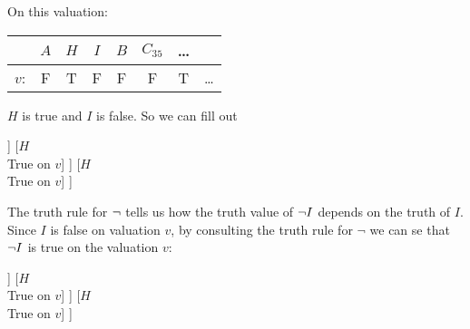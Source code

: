 On this valuation:
\begin{center}
	\begin{tabular}{rccccccc}
		&	$A$&$H$&$I$&$B$&$C_{35}$&\ldots\\\hline
		$v$:&	F & T &F&F&F&T&\ldots
	\end{tabular}
\end{center}
$H$ is true and $I$ is false. So we can fill out 
\begin{center}
	\begin{forest}
	[$(\enot I\eand H)\mainconnective{\eif} H$
	[$(\enot I\mainconnective{\eor} H)$
	[$\mainconnective{\enot} I$
	[$I$\\False on $v$]
	]
	[$H$\\True on $v$]
	]
	[$H$\\True on $v$]
	]
\end{forest}
\end{center}
%		

The truth rule for $\neg$ tells us how the truth value of $\neg I$ depends on the truth of $I$. 
Since $I$ is false on valuation $v$, by consulting the truth rule for $\neg$ we can se that $\neg I$ is true on the valuation $v$:
\begin{center}
	\begin{forest}
		[$(\enot I\eand H)\mainconnective{\eif} H$
		[$(\enot I\mainconnective{\eand} H)$
		[$\mainconnective{\enot} I$\\True on $v$
		[$I$\\False on $v$]
		]
		[$H$\\True on $v$]
		]
		[$H$\\True on $v$]
		]
	\end{forest}
\end{center}


